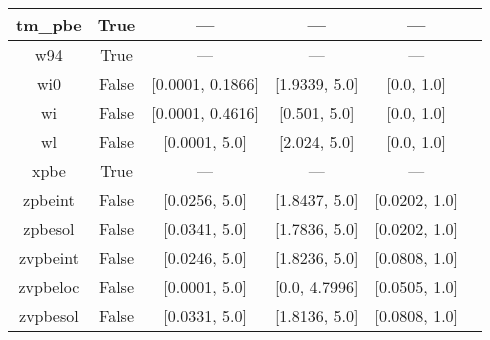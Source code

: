 \begin{tabular}{|c|c|c|c|c|l|}
       tm\_pbe &                  True &              --- &              --- &            --- &                                      \cite{Thakkar2009_134109} \\ \hline
           w94 &                  True &              --- &              --- &            --- &                                          \cite{Wilson1994_337} \\ \hline
           wi0 &                 False & [0.0001, 0.1866] &    [1.9339, 5.0] &     [0.0, 1.0] &                                          \cite{Wilson1998_523} \\ \hline
            wi &                 False & [0.0001, 0.4616] &     [0.501, 5.0] &     [0.0, 1.0] &                                          \cite{Wilson1998_523} \\ \hline
            wl &                 False &    [0.0001, 5.0] &     [2.024, 5.0] &     [0.0, 1.0] &                                        \cite{Wilson1990_12930} \\ \hline
          xpbe &                  True &              --- &              --- &            --- &                                             \cite{Xu2004_4068} \\ \hline
       zpbeint &                 False &    [0.0256, 5.0] &    [1.8437, 5.0] &  [0.0202, 1.0] &                                   \cite{Constantin2011_233103} \\ \hline
       zpbesol &                 False &    [0.0341, 5.0] &    [1.7836, 5.0] &  [0.0202, 1.0] &                                   \cite{Constantin2011_233103} \\ \hline
      zvpbeint &                 False &    [0.0246, 5.0] &    [1.8236, 5.0] &  [0.0808, 1.0] &                                   \cite{Constantin2012_194105} \\ \hline
      zvpbeloc &                 False &    [0.0001, 5.0] &    [0.0, 4.7996] &  [0.0505, 1.0] &                                         \cite{Fabiano2015_122} \\ \hline
      zvpbesol &                 False &    [0.0331, 5.0] &    [1.8136, 5.0] &  [0.0808, 1.0] &                                   \cite{Constantin2012_194105} \\ \hline
\end{tabular}